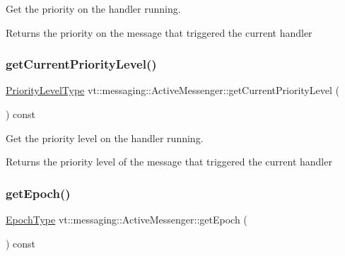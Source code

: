 Get the priority on the handler running. 

\begin{DoxyReturn}{Returns}
the priority on the message that triggered the current handler 
\end{DoxyReturn}
\mbox{\label{structvt_1_1messaging_1_1_active_messenger_abfa87fe46bbb97786ba2dcd923da8c39}} 
\subsubsection{\texorpdfstring{get\+Current\+Priority\+Level()}{getCurrentPriorityLevel()}}
{\footnotesize\ttfamily \hyperlink{namespacevt_a53e07fdb3351b0f263e0dfd51b968d5e}{Priority\+Level\+Type} vt\+::messaging\+::\+Active\+Messenger\+::get\+Current\+Priority\+Level (\begin{DoxyParamCaption}{ }\end{DoxyParamCaption}) const}



Get the priority level on the handler running. 

\begin{DoxyReturn}{Returns}
the priority level of the message that triggered the current handler 
\end{DoxyReturn}
\mbox{\label{structvt_1_1messaging_1_1_active_messenger_a627a8b2918ad283edf386038cf5693ca}} 
\subsubsection{\texorpdfstring{get\+Epoch()}{getEpoch()}}
{\footnotesize\ttfamily \hyperlink{namespacevt_a985a5adf291c34a3ca263b3378388236}{Epoch\+Type} vt\+::messaging\+::\+Active\+Messenger\+::get\+Epoch (\begin{DoxyParamCaption}{ }\end{DoxyParamCaption}) const\hspace{0.3cm}{\ttfamily [inline]}}



